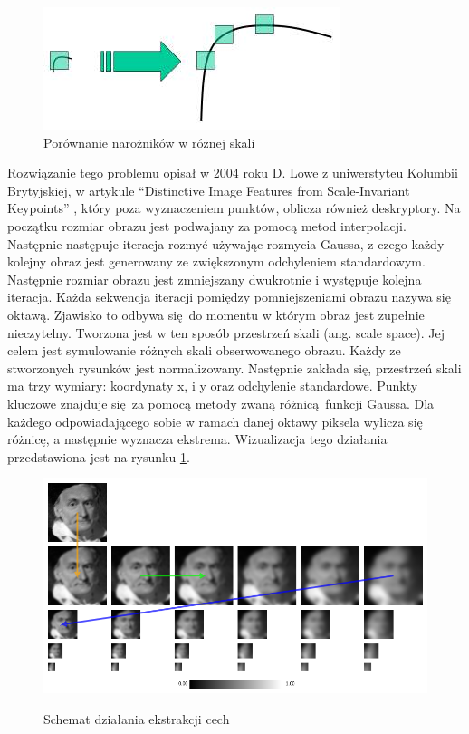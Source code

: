 \documentclass[12pt,twoside,polish]{article}
\begin{document}
\begin{figure}[h]
	\centering
	\includegraphics{sift_scale_invariant}
	\caption{Porównanie narożników w różnej skali \cite{sift_scale_invariant_img}}
	\end{figure}

Rozwiązanie tego problemu opisał w 2004 roku D. Lowe z uniwerstyteu Kolumbii Brytyjskiej, w artykule \enquote{Distinctive Image Features from Scale-Invariant Keypoints} \cite{dlowe}, który poza wyznaczeniem punktów, oblicza również deskryptory. Na początku rozmiar obrazu jest podwajany za pomocą metod interpolacji. Następnie następuje iteracja rozmyć używając rozmycia Gaussa, z czego każdy kolejny obraz jest generowany ze zwiększonym odchyleniem standardowym. Następnie rozmiar obrazu jest zmniejszany dwukrotnie i występuje kolejna iteracja. Każda sekwencja iteracji pomiędzy pomniejszeniami obrazu nazywa się oktawą. Zjawisko to odbywa się do momentu w którym obraz jest zupełnie nieczytelny. Tworzona jest w ten sposób przestrzeń skali (ang. scale space). Jej celem jest symulowanie różnych skali obserwowanego obrazu. Każdy ze stworzonych rysunków jest normalizowany. Następnie zakłada się, przestrzeń skali ma trzy wymiary: koordynaty x, i y oraz odchylenie standardowe. Punkty kluczowe znajduje się za pomocą metody zwaną różnicą funkcji Gaussa. Dla każdego odpowiadającego sobie w ramach danej oktawy piksela wylicza się różnicę, a następnie wyznacza ekstrema. Wizualizacja tego działania przedstawiona jest na rysunku \ref{sift_gaussian}.

\begin{figure}[h]
	\centering
	\includegraphics[width=\textwidth]{sift_gaussian}
	\label{sift_gaussian}
	\caption{Schemat działania ekstrakcji cech \cite{sift_gaussian_img}}
\end{figure}
\end{document}
